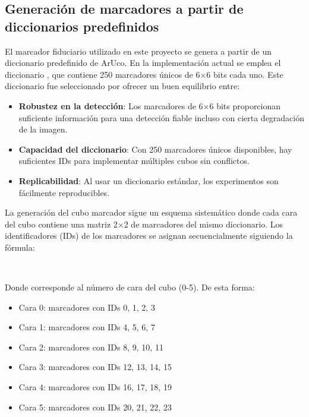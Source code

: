 \subsection{Generación de marcadores a partir de diccionarios predefinidos}
El marcador fiduciario utilizado en este proyecto se genera a partir de un diccionario predefinido de ArUco. En la implementación actual se emplea el diccionario , que contiene 250 marcadores únicos de 6×6 bits cada uno. Este diccionario fue seleccionado por ofrecer un buen equilibrio entre:

\begin{itemize}
    \item \textbf{Robustez en la detección}: Los marcadores de 6×6 bits proporcionan suficiente información para una detección fiable incluso con cierta degradación de la imagen.
    \item \textbf{Capacidad del diccionario}: Con 250 marcadores únicos disponibles, hay suficientes IDs para implementar múltiples cubos sin conflictos.
    \item \textbf{Replicabilidad}: Al usar un diccionario estándar, los experimentos son fácilmente reproducibles.
\end{itemize}

La generación del cubo marcador sigue un esquema sistemático donde cada cara del cubo contiene una matriz 2×2 de marcadores del mismo diccionario. Los identificadores (IDs) de los marcadores se asignan secuencialmente siguiendo la fórmula:

\begin{center}
\\
\end{center}

Donde  corresponde al número de cara del cubo (0-5). De esta forma:
\begin{itemize}
	\item Cara 0: marcadores con IDs 0, 1, 2, 3
	\item Cara 1: marcadores con IDs 4, 5, 6, 7
	\item Cara 2: marcadores con IDs 8, 9, 10, 11
	\item Cara 3: marcadores con IDs 12, 13, 14, 15
	\item Cara 4: marcadores con IDs 16, 17, 18, 19
	\item Cara 5: marcadores con IDs 20, 21, 22, 23
\end{itemize}

